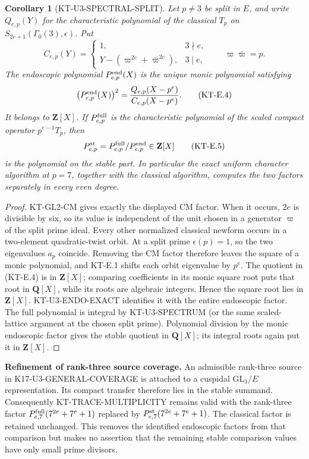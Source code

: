 \documentclass[11pt,a4paper]{article}
\newtheorem{corollary}[theorem]{Corollary}
\theoremstyle{definition}
\renewcommand{\paragraph}[1]{\par\smallskip\noindent\textbf{#1}\quad\ignorespaces}
\begin{document}
\begin{corollary}[KT-U3-SPECTRAL-SPLIT]
Let $p\ne3$ be split in $E$, and write $Q_{e,p}(Y)$ for the
characteristic polynomial of the classical $T_p$ on
$S_{2e+1}(\Gamma_0(3),\epsilon)$. Put
\[
 C_{e,p}(Y)=
 \begin{cases}
 1,&3\nmid e,\\
 Y-(\varpi^{2e}+\bar\varpi^{2e}),&3\mid e,
 \end{cases}
 \qquad \varpi\bar\varpi=p.
\]
The endoscopic polynomial $P^{\rm end}_{e,p}(X)$ is the unique
monic polynomial satisfying
\[
 \bigl(P^{\rm end}_{e,p}(X)\bigr)^2
       =\frac{Q_{e,p}(X-p^e)}{C_{e,p}(X-p^e)}.             \tag{KT-E.4}
\]
It belongs to $\mathbf Z[X]$. If $P^{\rm full}_{e,p}$ is the
characteristic polynomial of the scaled compact operator
$p^{e-1}T_p$, then
\[
 P^{\rm st}_{e,p}=P^{\rm full}_{e,p}/P^{\rm end}_{e,p}
       \in\mathbf Z[X]                                  \tag{KT-E.5}
\]
is the polynomial on the stable part. In particular the exact
uniform character algorithm at $p=7$, together with the classical
algorithm, computes the two factors separately in every even degree.
\end{corollary}
\begin{proof}
KT-GL2-CM gives exactly the displayed CM factor. When it occurs,
$2e$ is divisible by six, so its value is independent of the unit
chosen in a generator $\varpi$ of the split prime ideal.
Every other normalized classical newform occurs in a two-element
quadratic-twist orbit. At a split prime $\epsilon(p)=1$, so the
two eigenvalues $a_p$ coincide. Removing the CM factor therefore
leaves the square of a monic polynomial, and KT-E.1 shifts each
orbit eigenvalue by $p^e$. The quotient in (KT-E.4) is in
$\mathbf Z[X]$; comparing coefficients in its monic square root
puts that root in $\mathbf Q[X]$, while its roots are algebraic
integers. Hence the square root lies in $\mathbf Z[X]$.
KT-U3-ENDO-EXACT identifies it with the entire endoscopic factor.
The full polynomial is integral by KT-U3-SPECTRUM (or the same
scaled-lattice argument at the chosen split prime). Polynomial
division by the monic endoscopic factor gives the stable quotient
in $\mathbf Q[X]$; its integral roots again put it in
$\mathbf Z[X]$.
\end{proof}

\paragraph{Refinement of rank-three source coverage.}
An admissible rank-three source in K17-U3-GENERAL-COVERAGE
is attached to a cuspidal $\mathrm{GL}_3/E$ representation.
Its compact transfer therefore lies in the stable summand.
Consequently KT-TRACE-MULTIPLICITY remains valid with the
rank-three factor $P^{\rm full}_{e,7}(7^{2e}+7^e+1)$ replaced
by $P^{\rm st}_{e,7}(7^{2e}+7^e+1)$. The classical factor
is retained unchanged. This removes the identified endoscopic
factors from that comparison but makes no assertion that the
remaining stable comparison values have only small prime divisors.
\end{document}

